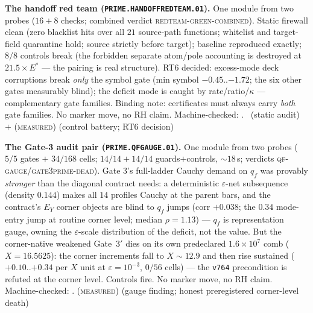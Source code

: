 \par\smallskip\noindent\textbf{The handoff red team
(\texttt{PRIME.HANDOFFREDTEAM.01}).}
One module from two probes ($16{+}8$ checks; combined verdict
\textsc{redteam-green-combined}).  Static firewall clean (zero
blacklist hits over all $21$ source-path functions; whitelist and
target-field quarantine hold; source strictly before target);
baseline reproduced exactly; $8/8$ controls break (the forbidden
separate atom/pole accounting is destroyed at $21.5\times E^*$ ---
the pairing is real structure).  RT6 decided: excess-mode deck
corruptions break \emph{only} the symbol gate (min symbol
$-0.45$..$-1.72$; the six other gates measurably blind); the
deficit mode is caught by rate/ratio/$\kappa$ --- complementary
gate families.  Binding note: certificates must always carry
\emph{both} gate families.  No marker move, no RH claim.
Machine-checked: .
\mE\ (static audit) $+$ (\textsc{measured}) (control battery; RT6
decision)
\par\smallskip


\par\smallskip\noindent\textbf{The Gate-3 audit pair
(\texttt{PRIME.QFGAUGE.01}).}
One module from two probes ($5/5$ gates $+$ $34/168$ cells;
$14/14+14/14$ guards$+$controls, ${\sim}18$\,s; verdicts
\textsc{qf-gauge}/\textsc{gate3prime-dead}).  Gate 3's full-ladder
Cauchy demand on $q_f$ was provably \emph{stronger} than the
diagonal contract needs: a deterministic $\varepsilon$-net
subsequence (density $0.144$) makes all $14$ profiles Cauchy at
the parent bars, and the contract's $E_Y$ corner objects are blind
to $q_f$ jumps (corr $+0.038$; the $0.34$ mode-entry jump at
routine corner level; median $\rho=1.13$) --- $q_f$ is
representation gauge, owning the $\varepsilon$-scale distribution
of the deficit, not the value.  But the corner-native weakened
Gate~$3'$ dies on its own predeclared $1.6\times10^{7}$ comb
($X=16.5625$): the corner increments fall to $X\sim12.9$ and then
rise sustained ($+0.10$..$+0.34$ per $X$ unit at
$\varepsilon=10^{-3}$, $0/56$ cells) --- the \texttt{v764}
precondition is refuted at the corner level.  Controls fire.
No marker move, no RH claim.
Machine-checked: .
(\textsc{measured}) (gauge finding; honest preregistered
corner-level death)
\par\smallskip


